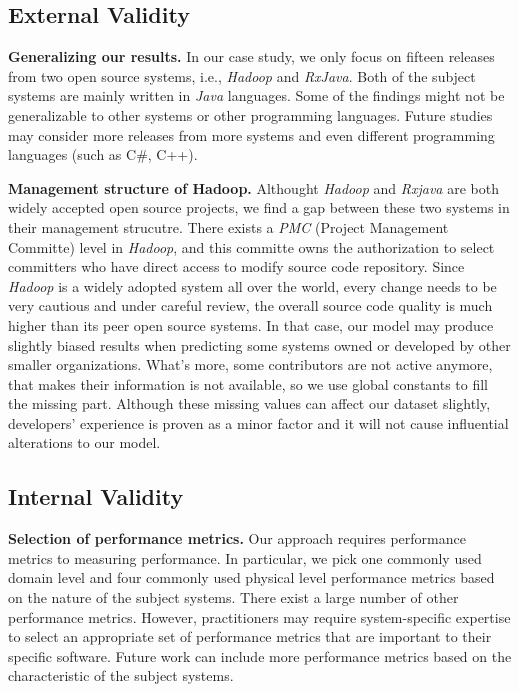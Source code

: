 \subsection{External Validity}

\textbf{Generalizing our results. }In our case study, we only focus on fifteen releases from two open source systems, i.e., \emph{Hadoop} and \emph{RxJava}. Both of the subject systems are mainly written in \emph{Java} languages. Some of the findings might not be generalizable to other systems or other programming languages. Future studies may consider more releases from more systems and even different programming languages (such as C\#, C++). 

\textbf{Management structure of Hadoop.} Althought \emph{Hadoop} and \emph{Rxjava} are both widely accepted open source projects, we find a gap between these two systems in their management strucutre. There exists a \emph{PMC} (Project Management Committe) level in \emph{Hadoop}, and this committe owns the authorization to select committers who have direct access to modify source code repository. Since \emph{Hadoop} is a widely adopted system all over the world, every change needs to be very cautious and under careful review, the overall source code quality is much higher than its peer open source systems. In that case, our model may produce slightly biased results when predicting some systems owned or developed by other smaller organizations. What's more, some contributors are not active anymore, that makes their information is not available, so we use global constants to fill the missing part. Although these missing values can affect our dataset slightly, developers' experience is proven as a minor factor and it will not cause influential alterations to our model.

\subsection{Internal Validity}

\textbf{Selection of performance metrics.} Our approach requires performance metrics to measuring performance. In particular, we pick one commonly used domain level and four commonly used physical level performance metrics based on the nature of the subject systems. There exist a large number of other performance metrics. However, practitioners may require system-specific expertise to select an appropriate set of performance metrics that are important to their specific software. Future work can include more performance metrics based on the characteristic of the subject systems. 

